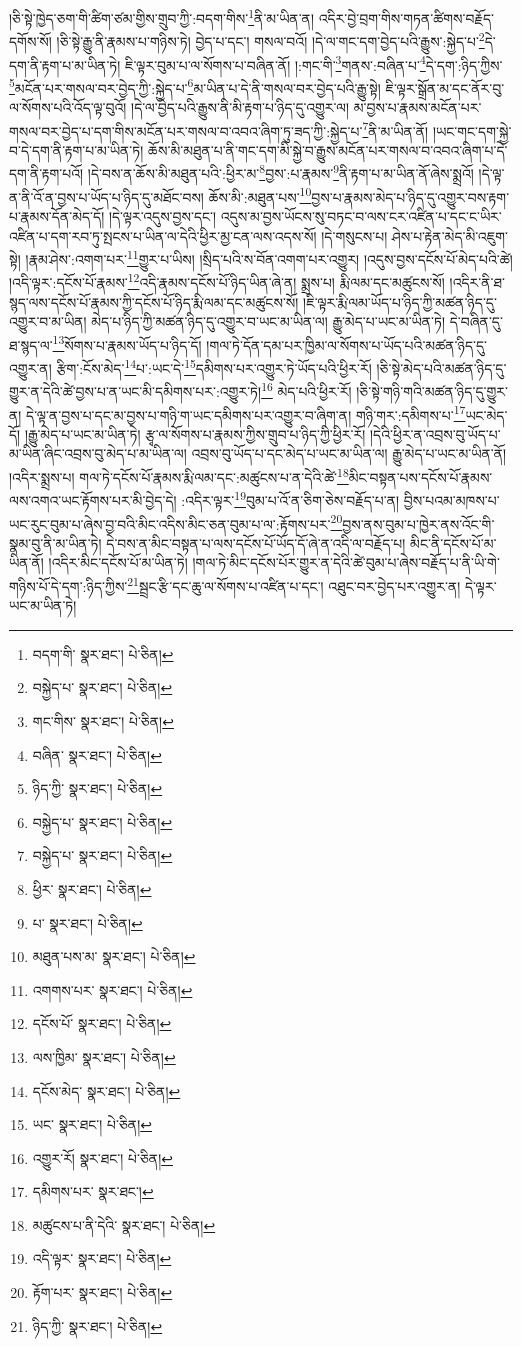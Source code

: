 །ཅི་སྟེ་ཁྱེད་ཅག་གི་ཚིག་ཙམ་གྱིས་གྲུབ་ཀྱི་:བདག་གིས་\footnote{བདག་གི་  སྣར་ཐང་།  པེ་ཅིན། }ནི་མ་ཡིན་ན། འདིར་བྱེ་བྲག་གིས་གཏན་ཚིགས་བརྗོད་དགོས་སོ། །ཅི་སྟེ་རྒྱུ་ནི་རྣམས་པ་གཉིས་ཏེ། བྱེད་པ་དང་། གསལ་བའོ། །དེ་ལ་གང་དག་བྱེད་པའི་རྒྱུས་:སྐྱེད་པ་\footnote{བསྐྱེད་པ་  སྣར་ཐང་།  པེ་ཅིན། }དེ་དག་ནི་རྟག་པ་མ་ཡིན་ཏེ། ཇི་ལྟར་བུམ་པ་ལ་སོགས་པ་བཞིན་ནོ། །:གང་གི་\footnote{གང་གིས་  སྣར་ཐང་།  པེ་ཅིན། }གནས་:བཞིན་པ་\footnote{བཞིན་  སྣར་ཐང་།  པེ་ཅིན། }དེ་དག་:ཉིད་ཀྱིས་\footnote{ཉིད་ཀྱི་  སྣར་ཐང་།  པེ་ཅིན། }མངོན་པར་གསལ་བར་བྱེད་ཀྱི་:སྐྱེད་པ་\footnote{བསྐྱེད་པ་  སྣར་ཐང་།  པེ་ཅིན། }མ་ཡིན་པ་དེ་ནི་གསལ་བར་བྱེད་པའི་རྒྱུ་སྟེ། ཇི་ལྟར་སྒྲོན་མ་དང་ནོར་བུ་ལ་སོགས་པའི་འོད་ལྟ་བུའོ། །དེ་ལ་བྱེད་པའི་རྒྱུས་ནི་མི་རྟག་པ་ཉིད་དུ་འགྱུར་ལ། མ་བྱས་པ་རྣམས་མངོན་པར་གསལ་བར་བྱེད་པ་དག་གིས་མངོན་པར་གསལ་བ་འབའ་ཞིག་ཏུ་ཟད་ཀྱི་:སྐྱེད་པ་\footnote{བསྐྱེད་པ་  སྣར་ཐང་།  པེ་ཅིན། }ནི་མ་ཡིན་ནོ། །ཡང་གང་དག་སྐྱེ་བ་དེ་དག་ནི་རྟག་པ་མ་ཡིན་ཏེ། ཆོས་མི་མཐུན་པ་ནི་གང་དག་མི་སྐྱེ་བ་རྒྱུས་མངོན་པར་གསལ་བ་འབའ་ཞིག་པ་དེ་དག་ནི་རྟག་པའོ། །དེ་བས་ན་ཆོས་མི་མཐུན་པའི་:ཕྱིར་མ་\footnote{ཕྱིར་  སྣར་ཐང་།  པེ་ཅིན། }བྱས་:པ་རྣམས་\footnote{པ་  སྣར་ཐང་།  པེ་ཅིན། }ནི་རྟག་པ་མ་ཡིན་ནོ་ཞེས་སྨྲའོ། །དེ་ལྟ་ན་ནི་འོ་ན་བྱས་པ་ཡོད་པ་ཉིད་དུ་མཐོང་བས། ཆོས་མི་:མཐུན་པས་\footnote{མཐུན་པས་མ་  སྣར་ཐང་།  པེ་ཅིན། }བྱས་པ་རྣམས་མེད་པ་ཉིད་དུ་འགྱུར་བས་རྟག་པ་རྣམས་དོན་མེད་དོ། །དེ་ལྟར་འདུས་བྱས་དང་། འདུས་མ་བྱས་ཡོངས་སུ་བཏང་བ་ལས་ངར་འཛིན་པ་དང་ང་ཡིར་འཛིན་པ་དག་རབ་ཏུ་སྤངས་པ་ཡིན་ལ་དེའི་ཕྱིར་མྱ་ངན་ལས་འདས་སོ། །དེ་གསུངས་པ། ཤེས་པ་རྟེན་མེད་མི་འཇུག་སྟེ། །རྣམ་ཤེས་:འགག་པར་\footnote{འགགས་པར་  སྣར་ཐང་།  པེ་ཅིན། }གྱུར་པ་ཡིས། །སྲིད་པའི་ས་བོན་འགག་པར་འགྱུར། །འདུས་བྱས་དངོས་པོ་མེད་པའི་ཚེ། །འདི་ལྟར་:དངོས་པོ་རྣམས་\footnote{དངོས་པོ་  སྣར་ཐང་།  པེ་ཅིན། }འདི་རྣམས་དངོས་པོ་ཉིད་ཡིན་ཞེ་ན། སྨྲས་པ། རྨི་ལམ་དང་མཚུངས་སོ། །འདིར་ནི་ཐ་སྙད་ལས་དངོས་པོ་རྣམས་ཀྱི་དངོས་པོ་ཉིད་རྨི་ལམ་དང་མཚུངས་སོ། །ཇི་ལྟར་རྨི་ལམ་ཡོད་པ་ཉིད་ཀྱི་མཚན་ཉིད་དུ་འགྱུར་བ་མ་ཡིན། མེད་པ་ཉིད་ཀྱི་མཚན་ཉིད་དུ་འགྱུར་བ་ཡང་མ་ཡིན་ལ། རྒྱུ་མེད་པ་ཡང་མ་ཡིན་ཏེ། དེ་བཞིན་དུ་ཐ་སྙད་ལ་\footnote{ལས་ཁྱིམ་  སྣར་ཐང་།  པེ་ཅིན། }སོགས་པ་རྣམས་ཡོད་པ་ཉིད་དོ། །གལ་ཏེ་དོན་དམ་པར་ཁྱིམ་ལ་སོགས་པ་ཡོད་པའི་མཚན་ཉིད་དུ་འགྱུར་ན། རྩིག་:ངོས་མེད་\footnote{དངོས་མེད་  སྣར་ཐང་།  པེ་ཅིན། }པ་:ཡང་དེ་\footnote{ཡང་  སྣར་ཐང་།  པེ་ཅིན། }དམིགས་པར་འགྱུར་ཏེ་ཡོད་པའི་ཕྱིར་རོ། །ཅི་སྟེ་མེད་པའི་མཚན་ཉིད་དུ་གྱུར་ན་དེའི་ཚེ་བྱས་པ་ན་ཡང་མི་དམིགས་པར་:འགྱུར་ཏེ།\footnote{འགྱུར་རོ།  སྣར་ཐང་།  པེ་ཅིན། } མེད་པའི་ཕྱིར་རོ། །ཅི་སྟེ་གཉི་གའི་མཚན་ཉིད་དུ་གྱུར་ན། དེ་ལྟ་ན་བྱས་པ་དང་མ་བྱས་པ་གཉི་ག་ཡང་དམིགས་པར་འགྱུར་བ་ཞིག་ན། གཉི་གར་:དམིགས་པ་\footnote{དམིགས་པར་  སྣར་ཐང་། }ཡང་མེད་དོ། །རྒྱུ་མེད་པ་ཡང་མ་ཡིན་ཏེ། རྩྭ་ལ་སོགས་པ་རྣམས་ཀྱིས་གྲུབ་པ་ཉིད་ཀྱི་ཕྱིར་རོ། །དེའི་ཕྱིར་ན་འབྲས་བུ་ཡོད་པ་མ་ཡིན་ཞིང་འབྲས་བུ་མེད་པ་མ་ཡིན་ལ། འབྲས་བུ་ཡོད་པ་དང་མེད་པ་ཡང་མ་ཡིན་ལ། རྒྱུ་མེད་པ་ཡང་མ་ཡིན་ནོ། །འདིར་སྨྲས་པ། གལ་ཏེ་དངོས་པོ་རྣམས་རྨི་ལམ་དང་:མཚུངས་པ་ན་དེའི་ཚེ་\footnote{མཚུངས་པ་ནི་དེའི་  སྣར་ཐང་།  པེ་ཅིན། }མིང་བསྟན་པས་དངོས་པོ་རྣམས་ལས་འགའ་ཡང་རྟོགས་པར་མི་བྱེད་དེ། :འདིར་ལྟར་\footnote{འདི་ལྟར་  སྣར་ཐང་།  པེ་ཅིན། }བུམ་པ་འོ་ན་ཅིག་ཅེས་བརྗོད་པ་ན། བྱིས་པའམ་མཁས་པ་ཡང་རུང་བུམ་པ་ཞེས་བྱ་བའི་མིང་འདིས་མིང་ཅན་བུམ་པ་ལ་:རྟོགས་པར་\footnote{རྟོག་པར་  སྣར་ཐང་།  པེ་ཅིན། }བྱས་ནས་བུམ་པ་ཁྱེར་ནས་འོང་གི་སྣམ་བུ་ནི་མ་ཡིན་ཏེ། དེ་བས་ན་མིང་བསྟན་པ་ལས་དངོས་པོ་ཡོད་དོ་ཞེ་ན་འདི་ལ་བརྗོད་པ། མིང་ནི་དངོས་པོ་མ་ཡིན་ནོ། །འདིར་མིང་དངོས་པོ་མ་ཡིན་ཏེ། །གལ་ཏེ་མིང་དངོས་པོར་གྱུར་ན་དེའི་ཚེ་བུམ་པ་ཞེས་བརྗོད་པ་ནི་ཡི་གེ་གཉིས་པོ་དེ་དག་:ཉིད་ཀྱིས་\footnote{ཉིད་ཀྱི་  སྣར་ཐང་།  པེ་ཅིན། }སྦྲང་རྩི་དང་ཆུ་ལ་སོགས་པ་འཛིན་པ་དང་། འཐུང་བར་བྱེད་པར་འགྱུར་ན། དེ་ལྟར་ཡང་མ་ཡིན་ཏེ། 